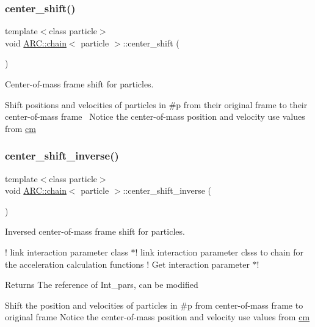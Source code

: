 \subsubsection{\texorpdfstring{center\+\_\+shift()}{center\_shift()}}
{\footnotesize\ttfamily template$<$class particle$>$ \\
void \hyperlink{classARC_1_1chain}{A\+R\+C\+::chain}$<$ particle $>$\+::center\+\_\+shift (\begin{DoxyParamCaption}{ }\end{DoxyParamCaption})\hspace{0.3cm}{\ttfamily [inline]}}



Center-\/of-\/mass frame shift for particles. 

Shift positions and velocities of particles in \#p from their original frame to their center-\/of-\/mass frame~\newline
Notice the center-\/of-\/mass position and velocity use values from \hyperlink{classARC_1_1chain_ae9f6a5cbf7aac2b33c7274e7e10916ed}{cm} \hypertarget{classARC_1_1chain_a52edc1843550578f5be5590b7403ef97}{}\label{classARC_1_1chain_a52edc1843550578f5be5590b7403ef97} 
\subsubsection{\texorpdfstring{center\+\_\+shift\+\_\+inverse()}{center\_shift\_inverse()}}
{\footnotesize\ttfamily template$<$class particle$>$ \\
void \hyperlink{classARC_1_1chain}{A\+R\+C\+::chain}$<$ particle $>$\+::center\+\_\+shift\+\_\+inverse (\begin{DoxyParamCaption}{ }\end{DoxyParamCaption})\hspace{0.3cm}{\ttfamily [inline]}}



Inversed center-\/of-\/mass frame shift for particles. 

! link interaction parameter class $\ast$! link interaction parameter clsss to chain for the acceleration calculation functions ! Get interaction parameter $\ast$! \begin{DoxyReturn}{Returns}
The reference of Int\+\_\+pars, can be modified
\end{DoxyReturn}
Shift the position and velocities of particles in \#p from center-\/of-\/mass frame to original frame Notice the center-\/of-\/mass position and velocity use values from \hyperlink{classARC_1_1chain_ae9f6a5cbf7aac2b33c7274e7e10916ed}{cm} \hypertarget{classARC_1_1chain_a5299fa50788dc7e5d15504c33f76333f}{}\label{classARC_1_1chain_a5299fa50788dc7e5d15504c33f76333f} 

